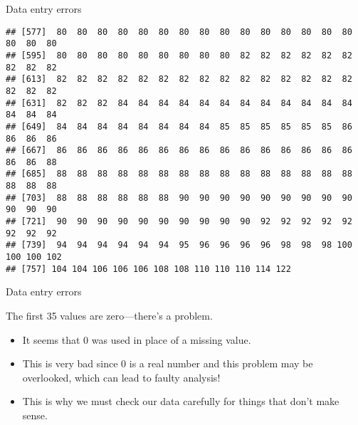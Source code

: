 \begin{frame}[fragile]{Data entry errors}
\begin{verbatim}
## [577]  80  80  80  80  80  80  80  80  80  80  80  80  80  80  80  80  80  80
## [595]  80  80  80  80  80  80  80  80  80  82  82  82  82  82  82  82  82  82
## [613]  82  82  82  82  82  82  82  82  82  82  82  82  82  82  82  82  82  82
## [631]  82  82  82  84  84  84  84  84  84  84  84  84  84  84  84  84  84  84
## [649]  84  84  84  84  84  84  84  84  85  85  85  85  85  85  86  86  86  86
## [667]  86  86  86  86  86  86  86  86  86  86  86  86  86  86  86  86  86  88
## [685]  88  88  88  88  88  88  88  88  88  88  88  88  88  88  88  88  88  88
## [703]  88  88  88  88  88  88  90  90  90  90  90  90  90  90  90  90  90  90
## [721]  90  90  90  90  90  90  90  90  90  90  92  92  92  92  92  92  92  92
## [739]  94  94  94  94  94  94  95  96  96  96  96  98  98  98 100 100 100 102
## [757] 104 104 106 106 106 108 108 110 110 110 114 122
\end{verbatim}

\end{frame}

\begin{frame}{Data entry errors}
\protect\hypertarget{data-entry-errors-1}{}

The first 35 values are zero---there's a problem.

\begin{itemize}
\tightlist
\item
  It seems that 0 was used in place of a missing value.
\item
  This is very bad since 0 is a real number and this problem may be
  overlooked, which can lead to faulty analysis!
\item
  This is why we must check our data carefully for things that don't
  make sense.
\end{itemize}

\end{frame}

